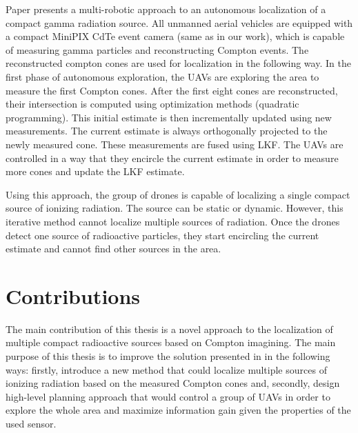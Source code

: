 Paper \cite{baca2021gamma} presents a multi-robotic approach to an autonomous localization of a compact gamma radiation source. 
All unmanned aerial vehicles are equipped with a compact MiniPIX CdTe event camera (same as in our work), which is capable of measuring gamma particles and reconstructing Compton events. 
The reconstructed compton cones are used for localization in the following way.
In the first phase of autonomous exploration, the \ac{UAV}s are exploring the area to measure the first Compton cones. 
After the first eight cones are reconstructed, their intersection is computed using optimization methods (quadratic programming). 
This initial estimate is then incrementally updated using new measurements. 
The current estimate is always orthogonally projected to the newly measured cone. 
These measurements are fused using \ac{LKF}. 
The \ac{UAV}s are controlled in a way that they encircle the current estimate in order to measure more cones and update the \ac{LKF} estimate.

Using this approach, the group of drones is capable of localizing a single compact source of ionizing radiation. 
The source can be static or dynamic. 
However, this iterative method cannot localize multiple sources of radiation.
Once the drones detect one source of radioactive particles, they start encircling the current estimate and cannot find other sources in the area.


\section{Contributions}
The main contribution of this thesis is a novel approach to the localization of multiple compact radioactive sources based on Compton imagining.
The main purpose of this thesis is to improve the solution presented in \cite{baca2021gamma} in the following ways: firstly, introduce a new method that could localize multiple sources of ionizing radiation based on the measured Compton cones and, 
secondly, 
design high-level planning approach that would control a group of \ac{UAV}s in order to explore the whole area and maximize information gain given the properties of the used sensor.
























